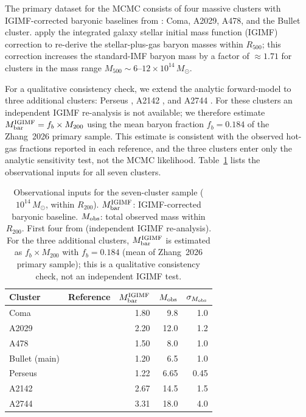 \documentclass[12pt,a4paper]{article}
\begin{document}
The primary dataset for the MCMC consists of four massive clusters
with IGIMF-corrected baryonic baselines from \citet{Zhang2026}:
Coma, A2029, A478, and the Bullet cluster.
\citet{Zhang2026} apply the integrated galaxy stellar initial mass
function (IGIMF) correction to re-derive the stellar-plus-gas baryon
masses within $R_{500}$; this correction increases the
standard-IMF baryon mass by a factor of $\approx1.71$ for clusters in
the mass range $M_{500}\sim6$--$12\times10^{14}\,M_\odot$.

For a qualitative consistency check, we extend the analytic forward-model
to three additional clusters: Perseus \citep{Simionescu2011},
A2142 \citep{Tchernin2016}, and A2744 \citep{Merten2011}.
For these clusters an independent IGIMF re-analysis is not available;
we therefore estimate $M_{\rm bar}^{\rm IGIMF} = f_b \times M_{200}$
using the mean baryon fraction $f_b=0.184$ of the Zhang~2026 primary sample.
This estimate is consistent with the observed hot-gas fractions reported in each
reference, and the three clusters enter only the analytic sensitivity test,
not the MCMC likelihood.
Table~\ref{tab:cluster_data} lists the observational inputs for all seven clusters.

\begin{table}[H]
\centering
\caption{Observational inputs for the seven-cluster sample
($10^{14}\,M_\odot$, within $R_{200}$).
$M_{\rm bar}^{\rm IGIMF}$: IGIMF-corrected baryonic baseline.
$M_{\rm obs}$: total observed mass within $R_{200}$.
First four from \citet{Zhang2026} (independent IGIMF re-analysis).
For the three additional clusters, $M_{\rm bar}^{\rm IGIMF}$ is estimated
as $f_b \times M_{200}$ with $f_b=0.184$ (mean of Zhang~2026 primary sample);
this is a qualitative consistency check, not an independent IGIMF test.}
\label{tab:cluster_data}
\small
\begin{tabular}{llrrr}
\toprule
Cluster & Reference & $M_{\rm bar}^{\rm IGIMF}$ & $M_{\rm obs}$ & $\sigma_{M_{\rm obs}}$ \\
\midrule
Coma          & \citet{Zhang2026}      & 1.80 & 9.8  & 1.0 \\
A2029         & \citet{Zhang2026}      & 2.20 & 12.0 & 1.2 \\
A478          & \citet{Zhang2026}      & 1.50 & 8.0  & 1.0 \\
Bullet (main) & \citet{Zhang2026}      & 1.20 & 6.5  & 1.0 \\
Perseus       & \citet{Simionescu2011} & 1.22 & 6.65 & 0.45 \\
A2142         & \citet{Tchernin2016}   & 2.67 & 14.5 & 1.5  \\
A2744         & \citet{Merten2011}     & 3.31 & 18.0 & 4.0  \\
\bottomrule
\end{tabular}
\end{table}
\end{document}

